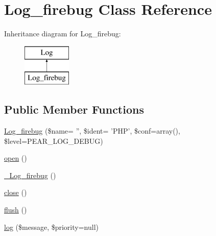 \hypertarget{class_log__firebug}{
\section{Log\_\-firebug Class Reference}
\label{class_log__firebug}
}
Inheritance diagram for Log\_\-firebug:\begin{figure}[H]
\begin{center}
\leavevmode
\includegraphics[height=2.000000cm]{class_log__firebug}
\end{center}
\end{figure}
\subsection*{Public Member Functions}
\begin{DoxyCompactItemize}
\item 
\hyperlink{class_log__firebug_ae64309117fe92dce5b6891c99de32e0e}{Log\_\-firebug} (\$name= '', \$ident= 'PHP', \$conf=array(), \$level=PEAR\_\-LOG\_\-DEBUG)
\item 
\hyperlink{class_log__firebug_a44a2ac59a3b91f8c18905dce700934d6}{open} ()
\item 
\hyperlink{class_log__firebug_a816e9b6c561ffff05e735153013c727d}{\_\-Log\_\-firebug} ()
\item 
\hyperlink{class_log__firebug_aa69c8bf1f1dcf4e72552efff1fe3e87e}{close} ()
\item 
\hyperlink{class_log__firebug_a7751f77b5263bcf940ece6e824a05b38}{flush} ()
\item 
\hyperlink{class_log__firebug_ac3758dfa38a67df158a446847cf06413}{log} (\$message, \$priority=null)
\end{DoxyCompactItemize}
